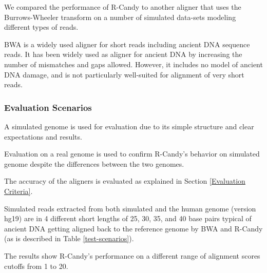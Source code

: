 \documentclass[11pt,a4paper]{report}
\begin{document}
We compared the performance of R-Candy to another aligner that uses the 
Burrows-Wheeler transform\cite{bwa} on a number of simulated data-sets modeling 
different types of reads. 

BWA is a widely used aligner for short reads including ancient DNA sequence 
reads. It has been widely used as aligner for ancient DNA by increasing the 
number of mismatches and gaps allowed. However, it includes no model of ancient 
DNA damage, and is not particularly well-suited for alignment of very short reads.





\subsubsection*{Evaluation Scenarios} \label{Evaluation Scenarios}

A simulated genome is used for evaluation due to its simple structure 
and clear expectations and results. 

Evaluation on a real genome is used to confirm R-Candy's behavior 
on simulated genome despite the differences between the two genomes.

The accuracy of the aligners is evaluated as explained in Section
 \ref{Evaluation Criteria}.

Simulated reads extracted from both simulated and the human genome
(version hg19) are in 4 different short lengths of 25, 30, 35, and 
40 base pairs typical of ancient DNA getting aligned back to the 
reference genome by BWA and R-Candy (as is described in Table 
\ref{test-scenarios}).

The results show R-Candy's performance on a different range of 
alignment scores cutoffs from 1 to 20.
\end{document}
